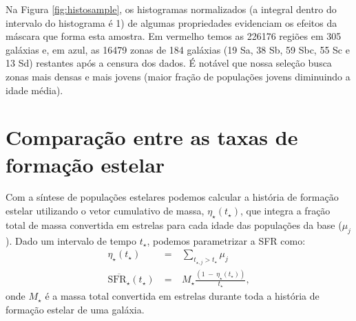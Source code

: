 Na Figura \ref{fig:histosample}, os histogramas normalizados (a integral dentro do intervalo do histograma é 1) de algumas propriedades evidenciam os efeitos da máscara que forma esta amostra. Em vermelho temos as 226176 regiões em 305 galáxias e, em azul, as 16479 zonas de 184 galáxias (19 Sa, 38 Sb, 59 Sbc, 55 Sc e 13 Sd) restantes após a censura dos dados. É notável que nossa seleção busca zonas mais densas e mais jovens (maior fração de populações jovens diminuindo a idade média).


\section{Comparação entre as taxas de formação estelar}
\label{apendice:synvsneb:SFR}

Com a síntese de populações estelares podemos calcular a história de formação estelar utilizando o vetor cumulativo de massa, $\eta_\star(t_\star)$, que integra a fração total de massa convertida em estrelas para cada idade das populações da base ($\mu_j$). Dado um intervalo de tempo $t_\star$, podemos parametrizar a SFR como:
\begin{eqnarray}
	\eta_\star(t_\star)\ &=&\ \sum\limits_{t_{\star,j} > t_\star} \mu_j \\
	\overline{\mathrm{SFR}_\star}(t_\star)\ &=&\ M_\star \frac{(1\ -\ \eta_\star(t_\star))}{t_\star},
	\label{eq:SFRSyn}
\end{eqnarray}
\noindent onde $M_\star$ é a massa total convertida em estrelas durante toda a história de formação estelar de uma galáxia.

